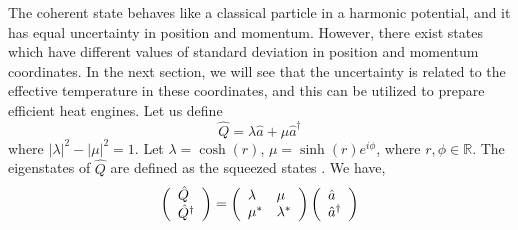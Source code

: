 \documentclass[12pt, twoside]{article}
\begin{document}
The coherent state behaves like a classical particle in a harmonic potential, and it has equal uncertainty in position and momentum. However, there exist states which have different values of standard deviation in position and momentum coordinates. In the next section, we will see that the uncertainty is related to the effective temperature in these coordinates, and this can be utilized to prepare efficient heat engines. Let us define \begin{equation} \label{eq:squeeze}
\hat{Q} = \lambda \hat{a} + \mu \hat{a}^\dagger
\end{equation} where $|\lambda|^2 - |\mu|^2 = 1$. Let $\lambda = \cosh(r)$, $\mu = \sinh(r)e^{i\phi}$, where $r,\phi \in \mathbb{R}$. The eigenstates of $\hat{Q}$ are defined as the squeezed states \cite{squeezed_reference}.
 We have,
 \[  \left( \begin{array} { l } { \hat { Q } } \\ { \hat { Q } ^ { \dagger } } \end{array} \right) = \left( \begin{array} { l l } { \lambda } & { \mu } \\ { \mu ^ { * } } & { \lambda ^ { * } } \end{array} \right) \left( \begin{array} { l } { \hat{a} } \\ { \hat{a}^\dagger } \end{array} \right)\]
 
\end{document}

